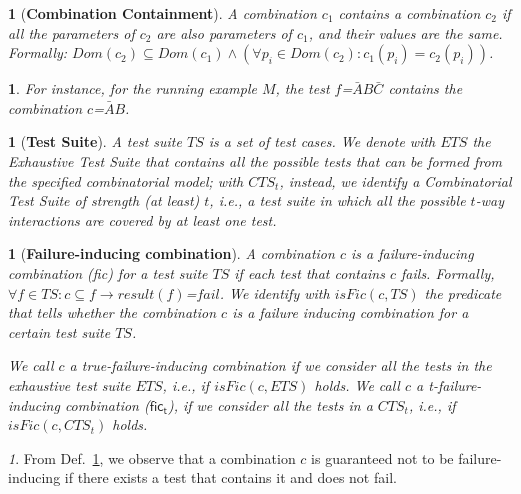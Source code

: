 \documentclass[
12pt, %
oneside, %
english, %
singlespacing, %
headsepline, %
consistentlayout, %
]{MastersDoctoralThesis} %
\newcommand{\dom}{\ensuremath{\mathit{Dom}}\xspace}
\newcommand{\fic}{\textsf{fic}\xspace}
\newcommand{\isFic}{\ensuremath{\mathit{isFic}}\xspace}
\newcommand{\result}{\ensuremath{\mathit{result}}\xspace}
\newcommand{\resultf}{\ensuremath{\mathit{\result(f)}}\xspace}
\newcommand{\ts}{\ensuremath{\mathit{TS}}\xspace}
\newcommand{\ets}{\ensuremath{\mathit{ETS}}\xspace}
\newcommand{\cts}{\ensuremath{\mathit{CTS}}\xspace}
\newtheorem{defn}[thm]{\protect\definitionname}
\newtheorem{example}[thm]{\protect\examplename}
\providecommand{\definitionname}{Definition}
\providecommand{\examplename}{Example}
\theoremstyle{plain}
\theoremstyle{definition}
\theoremstyle{remark}
\newtheorem{observation}{\protect\observationname}
\theoremstyle{plain}
\theoremstyle{plain}
\providecommand{\definitionname}{Definition}
\providecommand{\examplename}{Example}
\providecommand{\observationname}{Observation}
\theoremstyle{remark}
\begin{document}
\begin{defn}[\textbf{Combination Containment}]\label{def:combContainment}
	A combination $c_1$ contains a combination $c_2$ if all the parameters of $c_2$ are also parameters of $c_1$, and their values are the same. Formally: $\dom(c_2) \subseteq \dom(c_1) \wedge (\forall p_i \in \dom(c_2) \colon c_1(p_i) = c_2(p_i))$.
\end{defn}

\begin{example}
	For instance, for the running example $M$, the test $f$=$\bar{A}B\bar{C}$ contains the combination $c$=$\bar{A}B$.
\end{example}

\begin{defn}[\textbf{Test Suite}]
	A {\it test suite} \ts is a set of test cases. We denote with \ets the Exhaustive Test Suite that contains all the possible tests that can be formed from the specified combinatorial model; with $\cts_t$, instead, we identify a {\it Combinatorial Test Suite} of strength (at least) $t$, i.e., a test suite in which all the possible $t$-way interactions are covered by at least one test.
\end{defn}

\begin{defn}[\textbf{Failure-inducing combination}]\label{def:fic}
	A combination $c$ is a {\it failure-inducing combination} (\fic) for a test suite \ts if each test that \emph{contains} $c$ fails. Formally, $\forall f \in \ts \colon c \subseteq f \rightarrow \resultf$=$\textit{fail}$. We identify with $\isFic(c,\ts)$ the predicate that tells whether the combination $c$ is a failure inducing combination for a certain test suite \ts.
	
	We call $c$ a \textit{true}-failure-inducing combination if we consider all the tests in the exhaustive test suite \ets, i.e., if $\isFic(c, \ets)$ holds. We call $c$ a \textit{t}-failure-inducing combination ($\mathsf{fic_t}$), if we consider all the tests in a $\cts_t$, i.e., if $\isFic(c, \cts_t)$ holds.
\end{defn}

\begin{observation}\label{obs:notFailureInd}
	From Def.~\ref{def:fic}, we observe that a combination $c$ is guaranteed not to be failure-inducing if there exists a test that contains it and does not fail.
\end{observation}
\end{document}
